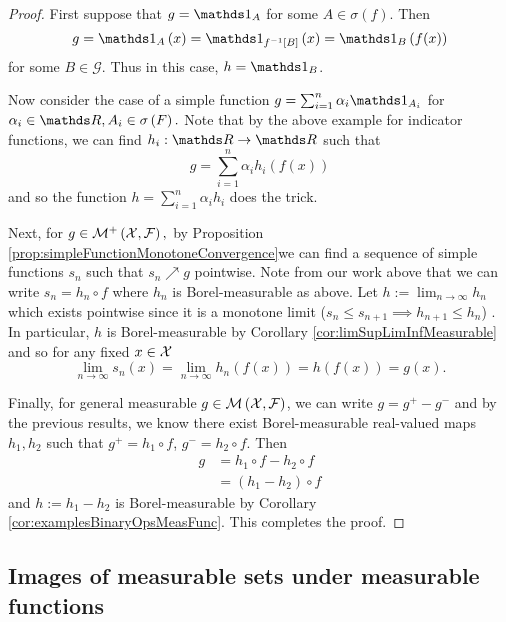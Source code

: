 \begin{proof}
First suppose that $g=\indicate_{A}$ for some $A\in\sigma\left(f\right).$
Then
\[
g=\indicate_{A}\left(x\right)=\indicate_{f^{-1}\left[B\right]}\left(x\right)=\indicate_{B}\left(f(x)\right)
\]
for some $B\in\mathcal{G}.$ Thus in this case, $h=\indicate_{B}$.

Now consider the case of a simple function $g=\sum_{i=1}^{n}\alpha_{i}\indicate_{A_{i}}$
for $\alpha_{i}\in\R,A_{i}\in\sigma\left(F\right).$ Note that by
the above example for indicator functions, we can find $h_{i}:\R\to\R$
such that 
\[
g=\sum_{i=1}^{n}\alpha_{i}h_{i}\left(f(x)\right)
\]
and so the function $h=\sum_{i=1}^{n}\alpha_{i}h_{i}$ does the trick.

Next, for $g\in\mathcal{M}^{+}\left(\mathcal{X},\mathcal{F}\right),$ by Proposition \ref{prop:simpleFunctionMonotoneConvergence}we
can find a sequence of simple functions $s_{n}$ such that $s_{n}\nearrow g$
pointwise. Note from our work above that we can write $s_{n}=h_{n}\circ f$
where $h_{n}$ is Borel-measurable as above. Let $h:=\lim_{n\to\infty}h_{n}$
which exists pointwise since it is a monotone limit ($s_{n}\leq s_{n+1}\implies h_{n+1}\leq h_{n}$)
. In particular, $h$ is Borel-measurable by Corollary \ref{cor:limSupLimInfMeasurable}
and so for any fixed $x\in\mathcal{X}$
\[
\lim_{n\to\infty}s_{n}\left(x\right)=\lim_{n\to\infty}h_{n}\left(f\left(x\right)\right)=h\left(f\left(x\right)\right)=g\left(x\right).
\]

Finally, for general measurable $g\in\mathcal{M}\left(\mathcal{X},\mathcal{F}\right)$, we can
write $g=g^{+}-g^{-}$ and by the previous results, we know there
exist Borel-measurable real-valued maps $h_{1},h_{2}$ such that $g^{+}=h_{1}\circ f$,
$g^{-}=h_{2}\circ f.$ Then
\begin{align*}
g & =h_{1}\circ f-h_{2}\circ f\\
 & =(h_{1}-h_{2})\circ f
\end{align*}
and $h:=h_{1}-h_{2}$ is Borel-measurable by Corollary \ref{cor:examplesBinaryOpsMeasFunc}.
This completes the proof.
\end{proof}

\subsection{Images of measurable sets under measurable functions}

